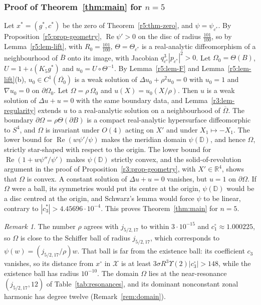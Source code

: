 \documentclass[11pt]{amsart}
\theoremstyle{definition}
\theoremstyle{remark}
\newtheorem{remark}[theorem]{Remark}
\numberwithin{equation}{section}
\newcommand{\R}{\mathbb{R}}
\newcommand{\D}{\mathbb{D}}
\DeclareMathOperator{\re}{Re}
\begin{document}
\subsubsection*{Proof of Theorem~\ref{thm:main} for $n=5$}
Let $x^*=(g^*,c^*)$ be the zero of Theorem~\ref{r5:thm-zero}, and $\psi=\psi_{c^*}$. By Proposition~\ref{r5:prop-geometry}, $\re\psi'>0$ on the disc of radius $\frac{101}{100}$, so by Lemma~\ref{r5:lem-lift}, with $R_0=\frac{101}{100}$, $\Theta=\Theta_{c^*}$ is a real-analytic diffeomorphism of a neighbourhood of $\overline B$ onto its image, with Jacobian $q_{c^*}^3|p_{c^*}|^2>0$. Let $\Omega_0=\Theta(B)$, $U=1+\iota(K_5g^*)$ and $u_0=U\circ\Theta^{-1}$. By Lemma~\ref{r5:lem-F} and Lemma~\ref{r5:lem-lift}(b), $u_0\in C^1(\overline{\Omega_0})$ is a weak solution of $\Delta u_0+\rho^2u_0=0$ with $u_0=1$ and $\nabla u_0=0$ on $\partial\Omega_0$. Let $\Omega=\rho\,\Omega_0$ and $u(X)=u_0(X/\rho)$. Then $u$ is a weak solution of $\Delta u+u=0$ with the same boundary data, and Lemma~\ref{r3:lem-regularity} extends $u$ to a real-analytic solution on a neighbourhood of $\overline\Omega$. The boundary $\partial\Omega=\rho\Theta(\partial B)$ is a compact real-analytic hypersurface diffeomorphic to $S^4$, and $\Omega$ is invariant under $O(4)$ acting on $X'$ and under $X_1\mapsto-X_1$. The lower bound for $\re(w\psi'/\psi)$ makes the meridian domain $\psi(\D)$, and hence $\Omega$, strictly star-shaped with respect to the origin. The lower bound for $\re(1+w\psi''/\psi')$ makes $\psi(\D)$ strictly convex, and the solid-of-revolution argument in the proof of Proposition~\ref{r3:prop-geometry}, with $X'\in\R^4$, shows that $\Omega$ is convex. A constant solution of $\Delta u+u=0$ vanishes, but $u=1$ on $\partial\Omega$. If $\Omega$ were a ball, its symmetries would put its centre at the origin, $\psi(\D)$ would be a disc centred at the origin, and Schwarz's lemma would force $\psi$ to be linear, contrary to $|c^*_3|>4.45696\cdot10^{-4}$. This proves Theorem~\ref{thm:main} for $n=5$.

\begin{remark}\label{r5:rem-ball}
The number $\rho$ agrees with $j_{5/2,17}$ to within $3\cdot10^{-15}$ and $c^\circ_1\approx1.000225$, so $\Omega$ is close to the Schiffer ball of radius $j_{5/2,17}$, which corresponds to $\psi(w)=(j_{5/2,17}/\rho)w$. That ball is far from the existence ball: its coefficient $c_3$ vanishes, so its distance from $x^\circ$ in $\mathcal X$ is at least $3\sigma R^3\Upsilon(2)|c^\circ_3|>148$, while the existence ball has radius $10^{-10}$. The domain $\Omega$ lies at the near-resonance $(j_{5/2,17},12)$ of Table~\ref{tab:resonances}, and its dominant nonconstant zonal harmonic has degree twelve (Remark~\ref{rem:domain}).
\end{remark}
\end{document}
